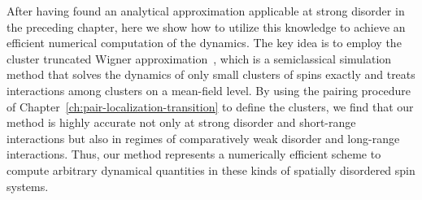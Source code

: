 After having found an analytical approximation applicable at strong disorder in the preceding chapter, here we show how to utilize this knowledge to achieve an efficient numerical computation of the dynamics. The key idea is to employ the cluster truncated Wigner approximation~\cite{wurtzClusterTruncatedWigner2018}, which is a semiclassical simulation method that solves the dynamics of only small clusters of spins exactly and treats interactions among clusters on a mean-field level. By using the pairing procedure of Chapter~\ref{ch:pair-localization-transition} to define the clusters, we find that our method is highly accurate not only at strong disorder and short-range interactions but also in regimes of comparatively weak disorder and long-range interactions. 
Thus, our method represents a numerically efficient scheme to compute arbitrary dynamical quantities in these kinds of spatially disordered spin systems.

\newpage
{}
